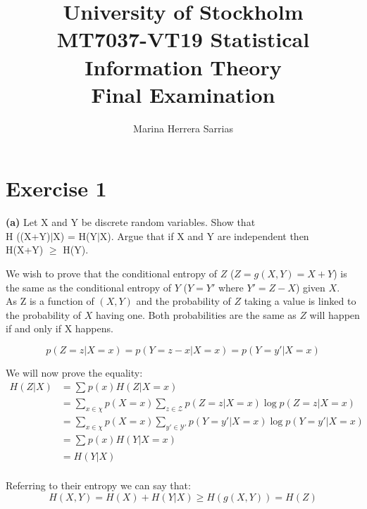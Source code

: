 \documentclass[11pt]{article}
\title{\vspace{-5.0cm}University of Stockholm\\ MT7037-VT19 Statistical Information Theory\\ Final Examination }
\author{Marina Herrera Sarrias }
\makeatletter
\newenvironment{proofw}{\par
	\pushQED{\qed}%
	\normalfont \topsep6\p@\@plus6\p@\relax
	\trivlist
	\item[]\ignorespaces
}{%
	\popQED\endtrivlist\@endpefalse
}
\makeatother
\begin{document}
\maketitle

\section{Exercise 1}

\begin{tcolorbox}
\textbf{(a)}
Let X and Y be discrete random variables. Show that\\
H ((X+Y)$|$X) = H(Y$|$X). Argue that if X and Y are independent then\\
H(X+Y) $\geq$ H(Y).
\end{tcolorbox}

\begin{proofw}
We wish to prove that the conditional entropy of $Z$ ($Z = g(X,Y) = X + Y$) is the same as the conditional entropy of $Y$ ($Y = Y'$ where $Y' = Z - X$) given $X$. \\

As Z is a function of $(X,Y)$ and the probability of $Z$ taking a value is linked to the probability of $X$ having one. Both probabilities are the same as $Z$ will happen if and only if X happens.

\begin{equation*}
p(Z=z|X=x) = p(Y=z-x|X=x) = p(Y=y'|X=x)
\end{equation*}

We will now prove the equality:\\
\begin{equation} \label{eq1}
\begin{split}
H(Z|X) & = \sum_{} p(x) H(Z|X=x)\\
	   & = \sum_{x \in \chi} p(X= x) \sum_{z \in \mathcal{Z}} p(Z=z|X=x) \log p(Z=z|X=x)\\
	  & = \sum_{x \in \chi} p(X= x) \sum_{y' \in \mathcal{Y'}} p(Y=y'|X=x) \log p(Y=y'|X=x)\\
	   & = \sum_{} p(x) H(Y|X=x)\\
	   & = H(Y|X)\\
\end{split}
\end{equation}

Referring to their entropy we can say that:
\begin{equation*}
 H(X,Y) = H(X) + H(Y|X) \geq  H(g(X,Y)) = H(Z) 
\end{equation*}


\end{proofw}
\end{document}
